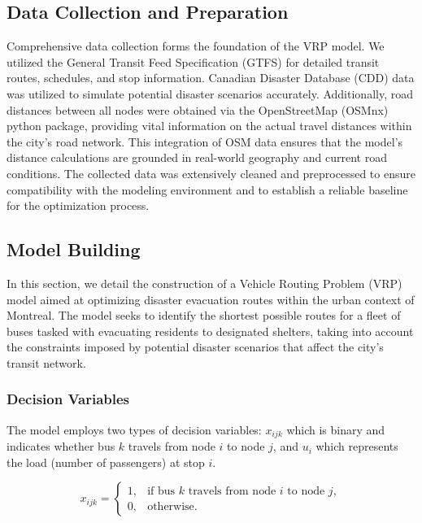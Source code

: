 \documentclass[12pt]{article}
\begin{document}
\subsection{Data Collection and Preparation}

Comprehensive data collection forms the foundation of the VRP model. We utilized the General Transit Feed Specification (GTFS) for detailed transit routes, schedules, and stop information. Canadian Disaster Database (CDD) data was utilized to simulate potential disaster scenarios accurately. Additionally, road distances between all nodes were obtained via the OpenStreetMap (OSMnx) python package, providing vital information on the actual travel distances within the city's road network. This integration of OSM data ensures that the model's distance calculations are grounded in real-world geography and current road conditions. The collected data was extensively cleaned and preprocessed to ensure compatibility with the modeling environment and to establish a reliable baseline for the optimization process.

\subsection{Model Building}

In this section, we detail the construction of a Vehicle Routing Problem (VRP) model aimed at optimizing disaster evacuation routes within the urban context of Montreal. The model seeks to identify the shortest possible routes for a fleet of buses tasked with evacuating residents to designated shelters, taking into account the constraints imposed by potential disaster scenarios that affect the city's transit network.

\subsubsection{Decision Variables}

The model employs two types of decision variables: \( x_{ijk} \) which is binary and indicates whether bus \( k \) travels from node \( i \) to node \( j \), and \( u_i \) which represents the load (number of passengers) at stop \( i \). 

\[
x_{ijk} = 
\begin{cases}
1, & \text{if bus } k \text{ travels from node } i \text{ to node } j,\\
0, & \text{otherwise}.
\end{cases}
\]
\end{document}

